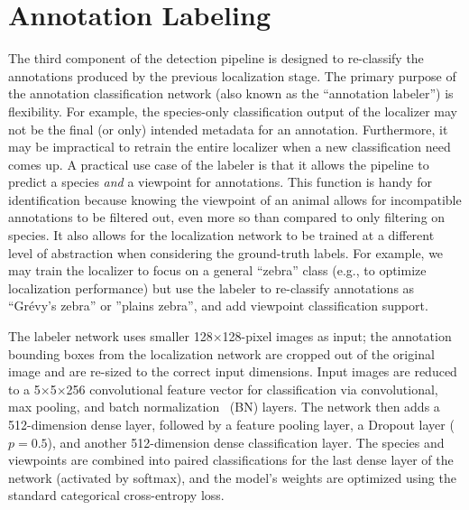 \section{Annotation Labeling} \label{sec:labeler}

The third component of the detection pipeline is designed to re-classify the annotations produced by the previous localization stage.  The primary purpose of the annotation classification network (also known as the ``annotation labeler'') is flexibility.  For example, the species-only classification output of the localizer may not be the final (or only) intended metadata for an annotation.  Furthermore, it may be impractical to retrain the entire localizer when a new classification need comes up.  A practical use case of the labeler is that it allows the pipeline to predict a species \textit{and} a viewpoint for annotations.  This function is handy for identification because knowing the viewpoint of an animal allows for incompatible annotations to be filtered out, even more so than compared to only filtering on species.  It also allows for the localization network to be trained at a different level of abstraction when considering the ground-truth labels.  For example, we may train the localizer to focus on a general ``zebra'' class (e.g., to optimize localization performance) but use the labeler to re-classify annotations as ``Gr\'evy's zebra'' or ''plains zebra'', and add viewpoint classification support.

The labeler network uses smaller 128$\times$128-pixel images as input; the annotation bounding boxes from the localization network are cropped out of the original image and are re-sized to the correct input dimensions.  Input images are reduced to a 5$\times$5$\times$256 convolutional feature vector for classification via convolutional, max pooling, and batch normalization~\cite{ioffe_batch_2015} (BN) layers.  The network then adds a 512-dimension dense layer, followed by a feature pooling layer, a Dropout layer ($p=0.5$), and another 512-dimension dense classification layer.  The species and viewpoints are combined into paired classifications for the last dense layer of the network (activated by softmax), and the model's weights are optimized using the standard categorical cross-entropy loss.

